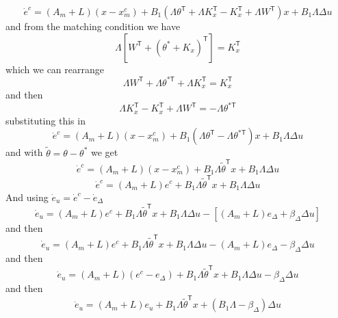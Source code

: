 \begin{equation*}
  \dot{e}^{c}=(A_{m}+L)(x-x_{m}^{c})+B_{1}(\Lambda\theta^{\mathsf{T}}+\Lambda K_{x}^{\mathsf{T}}-K_{x}^{\mathsf{T}}+\Lambda W^{\mathsf{T}})x+B_{1}\Lambda\Delta u
\end{equation*}
and from the matching condition we have
\begin{equation*}
  \Lambda\left[W^{\mathsf{T}}+(\theta^{*}+K_{x})^{\mathsf{T}}\right]=K_{x}^{\mathsf{T}}
\end{equation*}
which we can rearrange
\begin{equation*}
  \Lambda W^{\mathsf{T}}+\Lambda\theta^{*\mathsf{T}}+\Lambda K_{x}^{\mathsf{T}}=K_{x}^{\mathsf{T}}
\end{equation*}
and then
\begin{equation*}
  \Lambda K_{x}^{\mathsf{T}}-K_{x}^{\mathsf{T}}+\Lambda W^{\mathsf{T}}=-\Lambda\theta^{*\mathsf{T}}
\end{equation*}
substituting this in
\begin{equation*}
  \dot{e}^{c}=(A_{m}+L)(x-x_{m}^{c})+B_{1}(\Lambda\theta^{\mathsf{T}}-\Lambda\theta^{*\mathsf{T}})x+B_{1}\Lambda\Delta u
\end{equation*}
and with $\tilde{\theta}=\theta-\theta^{*}$ we get
\begin{equation*}
  \dot{e}^{c}=(A_{m}+L)(x-x_{m}^{c})+B_{1}\Lambda\tilde{\theta}^{\mathsf{T}}x+B_{1}\Lambda\Delta u
\end{equation*}
\begin{equation*}
  \dot{e}^{c}=(A_{m}+L)e^{c}+B_{1}\Lambda\tilde{\theta}^{\mathsf{T}}x+B_{1}\Lambda\Delta u
\end{equation*}
And using $\dot{e}_{u}=\dot{e}^{c}-\dot{e}_{\Delta}$
\begin{equation*}
  \dot{e}_{u}=(A_{m}+L)e^{c}+B_{1}\Lambda\tilde{\theta}^{\mathsf{T}}x+B_{1}\Lambda\Delta u-
  [(A_{m}+L)e_{\Delta}+\beta_{\Delta}\Delta u]
\end{equation*}
and then
\begin{equation*}
  \dot{e}_{u}=(A_{m}+L)e^{c}+B_{1}\Lambda\tilde{\theta}^{\mathsf{T}}x+B_{1}\Lambda\Delta u-
  (A_{m}+L)e_{\Delta}-\beta_{\Delta}\Delta u
\end{equation*}
and then
\begin{equation*}
  \dot{e}_{u}=(A_{m}+L)(e^{c}-e_{\Delta})+B_{1}\Lambda\tilde{\theta}^{\mathsf{T}}x+B_{1}\Lambda\Delta u-\beta_{\Delta}\Delta u
\end{equation*}
and then
\begin{equation*}
  \dot{e}_{u}=(A_{m}+L)e_{u}+B_{1}\Lambda\tilde{\theta}^{\mathsf{T}}x+(B_{1}\Lambda-\beta_{\Delta})\Delta u
\end{equation*}
